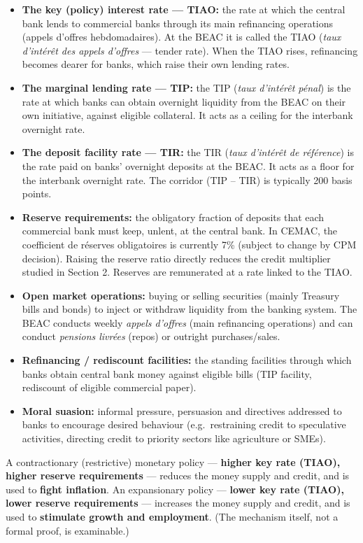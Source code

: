 \documentclass[11pt]{article}
\newcommand{\cle}[1]{{\popxbold\color{popdark}#1}}
\begin{document}
\begin{itemize}
\item \textbf{The key (policy) interest rate — TIAO:} the rate at which the central bank lends to commercial banks through its main refinancing operations (appels d'offres hebdomadaires). At the BEAC it is called the \cle{TIAO} (\emph{taux d'intérêt des appels d'offres} — tender rate). When the TIAO rises, refinancing becomes dearer for banks, which raise their own lending rates.
\item \textbf{The marginal lending rate — TIP:} the \cle{TIP} (\emph{taux d'intérêt pénal}) is the rate at which banks can obtain overnight liquidity from the BEAC on their own initiative, against eligible collateral. It acts as a ceiling for the interbank overnight rate.
\item \textbf{The deposit facility rate — TIR:} the \cle{TIR} (\emph{taux d'intérêt de référence}) is the rate paid on banks' overnight deposits at the BEAC. It acts as a floor for the interbank overnight rate. The corridor (TIP – TIR) is typically 200 basis points.
\item \textbf{Reserve requirements:} the obligatory fraction of deposits that each commercial bank must keep, unlent, at the central bank. In CEMAC, the \cle{coefficient de réserves obligatoires} is currently 7\% (subject to change by CPM decision). Raising the reserve ratio directly reduces the credit multiplier studied in Section 2. Reserves are remunerated at a rate linked to the TIAO.
\item \textbf{Open market operations:} buying or selling securities (mainly Treasury bills and bonds) to inject or withdraw liquidity from the banking system. The BEAC conducts weekly \emph{appels d'offres} (main refinancing operations) and can conduct \emph{pensions livrées} (repos) or outright purchases/sales.
\item \textbf{Refinancing / rediscount facilities:} the standing facilities through which banks obtain central bank money against eligible bills (TIP facility, rediscount of eligible commercial paper).
\item \textbf{Moral suasion:} informal pressure, persuasion and directives addressed to banks to encourage desired behaviour (e.g.\ restraining credit to speculative activities, directing credit to priority sectors like agriculture or SMEs).
\end{itemize}

\begin{propriete}
A \cle{contractionary} (restrictive) monetary policy — \textbf{higher key rate (TIAO), higher reserve requirements} — reduces the money supply and credit, and is used to \textbf{fight inflation}. An \cle{expansionary} policy — \textbf{lower key rate (TIAO), lower reserve requirements} — increases the money supply and credit, and is used to \textbf{stimulate growth and employment}. (The mechanism itself, not a formal proof, is examinable.)
\end{propriete}
\end{document}
